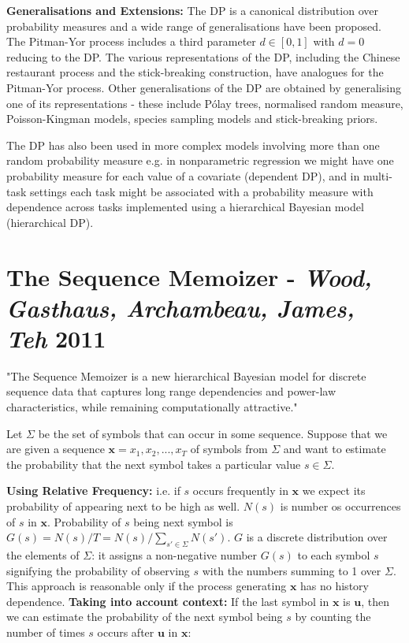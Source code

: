 \textbf{Generalisations and Extensions:} The DP is a canonical distribution over probability measures and a wide range of generalisations have been proposed. The Pitman-Yor process includes a third parameter $d\in[0,1]$ with $d=0$ reducing to the DP. The various representations of the DP, including the Chinese restaurant process and the stick-breaking construction, have analogues for the Pitman-Yor process. Other generalisations of the DP are obtained by generalising one of its representations - these include P\'{o}lay trees, normalised random measure, Poisson-Kingman models, species sampling models and stick-breaking priors.

The DP has also been used in more complex models involving more than one random probability measure e.g. in nonparametric regression we might have one probability measure for each value of a covariate (dependent DP), and in multi-task settings each task might be associated with a probability measure with dependence across tasks implemented using a hierarchical Bayesian model (hierarchical DP).

\section{The Sequence Memoizer - \textit{Wood, Gasthaus, Archambeau, James, Teh} 2011} \cite{wood2011sequence}

"The Sequence Memoizer is a new hierarchical Bayesian model for discrete sequence data that captures long range dependencies and power-law characteristics, while remaining computationally attractive."

Let $\Sigma$ be the set of symbols that can occur in some sequence. Suppose that we are given a sequence $\boldsymbol{x}=x_{1}, x_{2}, ..., x_{T}$ of symbols from $\Sigma$ and want to estimate the probability that the next symbol takes a particular value $s \in \Sigma$.

\textbf{Using Relative Frequency:} i.e. if $s$ occurs frequently in $\boldsymbol{x}$ we expect its probability of appearing next to be high as well. $N(s)$ is number os occurrences of $s$ in $\boldsymbol{x}$. Probability of $s$ being next symbol is $G(s)=N(s)/T=N(s)/\sum_{s' \in \Sigma}N(s')$. $G$ is a discrete distribution over the elements of $\Sigma$: it assigns a non-negative number $G(s)$ to each symbol $s$ signifying the probability of observing $s$ with the numbers summing to 1 over $\Sigma$. This approach is reasonable only if the process generating $\boldsymbol{x}$ has no history dependence. 
\textbf{Taking into account context:} If the last symbol in $\boldsymbol{x}$ is $\boldsymbol{u}$, then we can estimate the probability of the next symbol being $s$ by counting the number of times $s$ occurs after $\boldsymbol{u}$ in $\boldsymbol{x}$:

